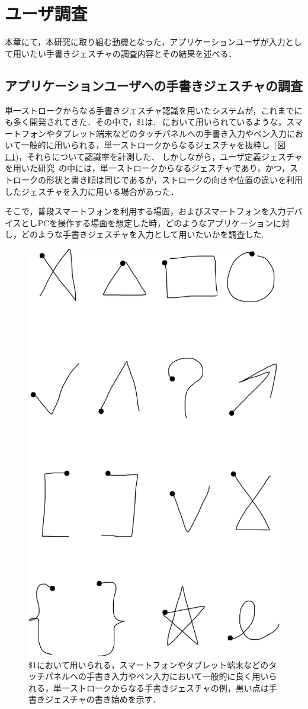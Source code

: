 \chapter{ユーザ調査}
本章にて，本研究に取り組む動機となった，アプリケーションユーザが入力として用いたい手書きジェスチャの調査内容とその結果を述べる．

\section{アプリケーションユーザへの手書きジェスチャの調査}
単一ストロークからなる手書きジェスチャ認識を用いたシステムが，これまでにも多く開発されてきた．その中で，\$1は,  ~\cite{Hong:2000:STI:354401.354412, Landay:1993:EEU:259964.260123, Lin:2000:DFT:332040.332486}において用いられているような，スマートフォンやタブレット端末などのタッチパネルへの手書き入力やペン入力において一般的に用いられる，単一ストロークからなるジェスチャを抜粋し~(図\ref{fig:stroke_1})，それらについて認識率を計測した．
しかしながら，ユーザ定義ジェスチャを用いた研究~\cite{Vatavu:2012:UGF:2325616.2325626, Bragdon:2011:EAT:1978942.1979000, Wobbrock:2009:UGS:1518701.1518866, Shimon:2015:EUB:2785830.2785890}の中には，単一ストロークからなるジェスチャであり，かつ，ストロークの形状と書き順は同じであるが，ストロークの向きや位置の違いを利用したジェスチャを入力に用いる場合があった．

そこで，普段スマートフォンを利用する場面，およびスマートフォンを入力デバイスとしPCを操作する場面を想定した時，どのようなアプリケーションに対し，どのような手書きジェスチャを入力として用いたいかを調査した.

\begin{figure}[!h]
\centering
\includegraphics[width=0.4\columnwidth]{img/stroke_1.eps}
\caption{\$1において用いられる，スマートフォンやタブレット端末などのタッチパネルへの手書き入力やペン入力において一般的に良く用いられる，単一ストロークからなる手書きジェスチャの例，黒い点は手書きジェスチャの書き始めを示す．}
\label{fig:stroke_1}
\end{figure}

